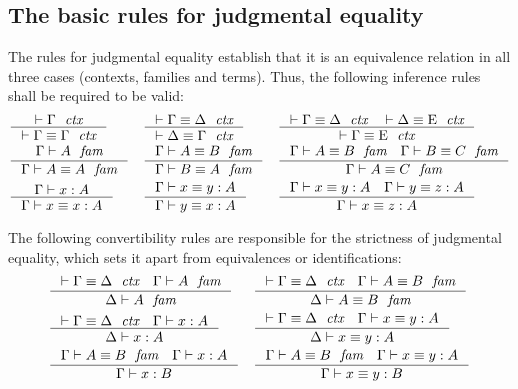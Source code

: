 \subsection{The basic rules for judgmental equality}
The rules for judgmental equality establish that it is an equivalence relation
in all three cases (contexts, families and terms). Thus, the following inference
rules shall be required to be valid:
\bgroup\small
\begin{align*}
& \inference
  { \jctx{\Gamma}
    }
  { \jctxeq{\Gamma}{\Gamma}
    } 
& & \inference
    { \jctxeq{\Gamma}{\Delta}
      }
    { \jctxeq{\Delta}{\Gamma}
      } 
& & \inference
    { \jctxeq{\Gamma}{\Delta}
      \jctxeq{\Delta}{\greek{E}}
      }
    { \jctxeq{\Gamma}{\greek{E}}
      }
    \\
& \inference
  { \jfam{\Gamma}{A}
    }
  { \jfameq{\Gamma}{A}{A}
    } 
& & \inference
    { \jfameq{\Gamma}{A}{B}
      }
    { \jfameq{\Gamma}{B}{A}
      }
& & \inference
    { \jfameq{\Gamma}{A}{B}
      \jfameq{\Gamma}{B}{C}
      }
    { \jfameq{\Gamma}{A}{C}
      }
    \\
& \inference
  { \jterm{\Gamma}{A}{x}
    }
  { \jtermeq{\Gamma}{A}{x}{x}
    }
& & \inference
    { \jtermeq{\Gamma}{A}{x}{y}
      }
    { \jtermeq{\Gamma}{A}{y}{x}
      }
& & \inference
    { \jtermeq{\Gamma}{A}{x}{y}
      \jtermeq{\Gamma}{A}{y}{z}
      }
    { \jtermeq{\Gamma}{A}{x}{z}
      }
\end{align*}
\egroup

The following convertibility rules are responsible for the strictness
of judgmental equality, which sets it apart from equivalences or identifications:
\begin{align*}
& \inference
  { \jctxeq{\Gamma}{\Delta}
    \jfam{\Gamma}{A}
    }
  { \jfam{\Delta}{A}
    }
& & \inference
    { \jctxeq{\Gamma}{\Delta}
      \jfameq{\Gamma}{A}{B}
      }
    { \jfameq{\Delta}{A}{B}
      }
    \\
& \inference
  { \jctxeq{\Gamma}{\Delta}
    \jterm{\Gamma}{A}{x}
    }
  { \jterm{\Delta}{A}{x}
    }
& & \inference
    { \jctxeq{\Gamma}{\Delta}
      \jtermeq{\Gamma}{A}{x}{y}
      }
    { \jtermeq{\Delta}{A}{x}{y}
      }
    \\
& \inference
  { \jfameq{\Gamma}{A}{B}
    \jterm{\Gamma}{A}{x}
    }
  { \jterm{\Gamma}{B}{x}
    }
& & \inference
    { \jfameq{\Gamma}{A}{B}
      \jtermeq{\Gamma}{A}{x}{y}
      }
    { \jtermeq{\Gamma}{B}{x}{y}
      }
\end{align*}

